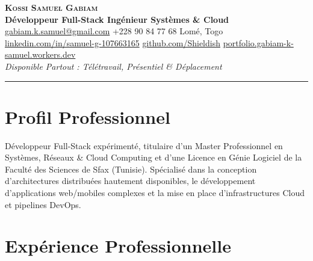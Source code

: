 \documentclass[11pt, a4paper]{article}
\begin{document}
\color{black} %

\begin{center}
  {\Huge\bfseries\scshape Kossi Samuel Gabiam}\\[6pt]
  {\large\bfseries Développeur Full-Stack \textbullet{} Ingénieur Systèmes \& Cloud}\\[8pt]
  \small
  \href{mailto:gabiam.k.samuel@gmail.com}{gabiam.k.samuel@gmail.com}
  \quad\textbullet\quad
  +228 90 84 77 68
  \quad\textbullet\quad
  Lomé, Togo\\[3pt]
  \href{https://www.linkedin.com/in/samuel-g-107663165/}{linkedin.com/in/samuel-g-107663165}
  \quad\textbullet\quad
  \href{https://github.com/Shieldish}{github.com/Shieldish}
  \quad\textbullet\quad
  \href{https://portfolio.gabiam-k-samuel.workers.dev/}{portfolio.gabiam-k-samuel.workers.dev}\\[4pt]
  {\small\color{secondary}\textit{Disponible Partout : Télétravail, Présentiel \& Déplacement}}
\end{center}

\vspace{-2pt}
\noindent\rule{\linewidth}{1pt}
\vspace{6pt}

\section{Profil Professionnel}

Développeur Full-Stack expérimenté, titulaire d'un Master Professionnel en Systèmes, Réseaux \& Cloud Computing et d'une Licence en Génie Logiciel de la Faculté des Sciences de Sfax (Tunisie). Spécialisé dans la conception d'architectures distribuées hautement disponibles, le développement d'applications web/mobiles complexes et la mise en place d'infrastructures Cloud et pipelines DevOps.

\section{Expérience Professionnelle}
\end{document}
